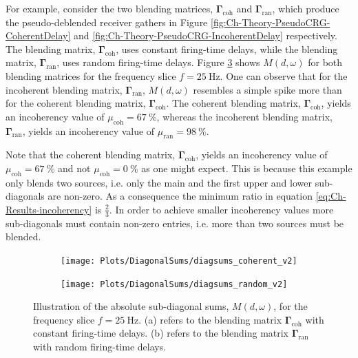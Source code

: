 For example, consider the two blending matrices, $\mathbf{\Gamma}_{\mathrm{coh}}$ and $\mathbf{\Gamma}_{\mathrm{ran}}$, which produce the pseudo-deblended receiver gathers in Figure \ref{fig:Ch-Theory-PseudoCRG-CoherentDelay} and \ref{fig:Ch-Theory-PseudoCRG-IncoherentDelay} respectively. The blending matrix, $\mathbf{\Gamma}_{\mathrm{coh}}$, uses constant firing-time delays, while the blending matrix, $\mathbf{\Gamma}_{\mathrm{ran}}$, uses random firing-time delays. Figure \ref{fig:Ch-Incoherency-Coh-vs-Ran-Diag} shows $M(d,\omega)$ for both blending matrices for the frequency slice $f=\SI{25}{\hertz}$. One can observe that for the incoherent blending matrix, $\mathbf{\Gamma}_{\mathrm{ran}}$, $M(d,\omega)$ resembles a simple spike more than for the coherent blending matrix, $\mathbf{\Gamma}_{\mathrm{coh}}$. The coherent blending matrix, $\mathbf{\Gamma}_{\mathrm{coh}}$,  yields an incoherency value of $\mu_{\mathrm{coh}} = \SI{67}{\percent}$, whereas the incoherent blending matrix, $\mathbf{\Gamma}_{\mathrm{ran}}$, yields an incoherency value of $\mu_{\mathrm{ran}} = \SI{98}{\percent}$. 

Note that the coherent blending matrix, $\mathbf{\Gamma}_{\mathrm{coh}}$, yields an incoherency value of $\mu_{\mathrm{coh}} = \SI{67}{\percent}$ and not $\mu_{\mathrm{coh}} = \SI{0}{\percent}$ as one might expect. This is because this example only blends two sources, i.e. only the main and the first upper and lower sub-diagonals are non-zero. As a consequence the minimum ratio in equation \ref{eq:Ch-Results-incoherency} is $\frac{2}{3}$. In order to achieve smaller incoherency values more sub-diagonals must contain non-zero entries, i.e. more than two sources must be blended.

\begin{figure}
	
	\centering
	\begin{subfigure}[b]{0.45\textwidth}
	\centering
	\texttt{[image: Plots/DiagonalSums/diagsums\_coherent\_v2]}	
	\caption{}
	\label{fig:Ch-Incoherency-CoherentDiag}	
	\end{subfigure}
	\centering
	\begin{subfigure}[b]{0.45\textwidth}
	\centering
	\texttt{[image: Plots/DiagonalSums/diagsums\_random\_v2]}	
	\caption{}
	\label{fig:Ch-Incoherency-RandomDiag}	
	\end{subfigure}
	
	\caption{Illustration of the absolute sub-diagonal sums, $M(d,\omega)$, for the frequency slice $f=\SI{25}{\hertz}$. (a) refers to the blending matrix $\mathbf{\Gamma}_{\mathrm{coh}}$ with constant firing-time delays.  (b) refers to the blending matrix $\mathbf{\Gamma}_{\mathrm{ran}}$ with random firing-time delays.}
	\label{fig:Ch-Incoherency-Coh-vs-Ran-Diag}
	
\end{figure}


